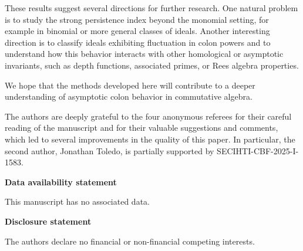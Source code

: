\documentclass[11pt]{amsart}
\begin{document}
These results suggest several directions for further research. One natural problem is to study the strong persistence index beyond the monomial setting, for example in binomial or more general classes of ideals. Another interesting direction is to classify ideals exhibiting fluctuation in colon powers and to understand how this behavior interacts with other homological or asymptotic invariants, such as depth functions, associated primes, or Rees algebra properties.

We hope that the methods developed here will contribute to a deeper understanding of asymptotic colon behavior in commutative algebra.



\bigskip
{} \par 
The authors are deeply grateful to the four anonymous referees for their careful reading of the manuscript and for their valuable suggestions and comments, which led to several improvements in the quality of this paper. In particular, the second author, Jonathan Toledo, is partially supported by SECIHTI-CBF-2025-I-1583.

  




 \bigskip
\noindent\textbf{Data availability statement}\par
This manuscript has no associated data.  


\bigskip
\noindent\textbf{Disclosure statement}\par 
The authors declare no financial or non-financial competing interests.  


\end{document}
